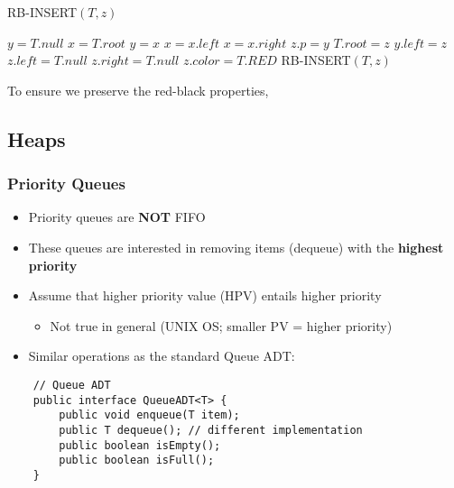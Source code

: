 \documentclass[10pt, 
a4paper, 
oneside, 
headinclude, footinclude, 
BCOR5mm]
{scrartcl}
\begin{document}
\begin{algorithm}
    \caption{RB-INSERT$(T,z)$}
    \BlankLine

    $y=T.null$\;
    $x=T.root$\;
        {$y=x$\;        
            {$x=x.left$\;}
        {$x=x.right$\;}}
    $z.p=y$\;
        {$T.root=z$\;}
        {$y.left=z$\;}
    $z.left=T.null$\;
    $z.right=T.null$\;
    $z.color=T.RED$\;
    RB-INSERT$(T,z)$\;
    
\end{algorithm}

To ensure we preserve the {\color{red}red}-black properties, 
\newpage

\subsection{Heaps}

\subsubsection{Priority Queues} \label{subsubsec:prio-q}
\begin{itemize}
    \item Priority queues are \textbf{NOT} FIFO
    \item These queues are interested in removing items (dequeue) with the \textbf{highest priority}
    \item Assume that higher priority value (HPV) entails higher priority
    \begin{itemize}
        \item Not true in general (UNIX OS; smaller PV = higher priority)
    \end{itemize}
    \item Similar operations as the standard Queue ADT:
\end{itemize}

\begin{lstlisting}
    // Queue ADT
    public interface QueueADT<T> {
        public void enqueue(T item);
        public T dequeue(); // different implementation
        public boolean isEmpty();
        public boolean isFull();
    }
\end{lstlisting}
\BlankLine
\end{document}
